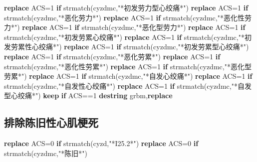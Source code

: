\documentclass[
]{book}
\newenvironment{Shaded}{\begin{snugshade}}{\end{snugshade}}
\newcommand{\FunctionTok}[1]{\textcolor[rgb]{0.00,0.00,0.00}{#1}}
\newcommand{\KeywordTok}[1]{\textcolor[rgb]{0.13,0.29,0.53}{\textbf{#1}}}
\newcommand{\NormalTok}[1]{#1}
\newcommand{\StringTok}[1]{\textcolor[rgb]{0.31,0.60,0.02}{#1}}
\begin{document}
\begin{Shaded}
\begin{Highlighting}[]
\KeywordTok{replace}\NormalTok{ ACS=1 }\KeywordTok{if} \FunctionTok{strmatch}\NormalTok{(cyzdmc,}\StringTok{"*初发劳力型心绞痛*"}\NormalTok{)}
\KeywordTok{replace}\NormalTok{ ACS=1 }\KeywordTok{if} \FunctionTok{strmatch}\NormalTok{(cyzdmc,}\StringTok{"*恶化劳力*"}\NormalTok{)}
\KeywordTok{replace}\NormalTok{ ACS=1 }\KeywordTok{if} \FunctionTok{strmatch}\NormalTok{(cyzdmc,}\StringTok{"*恶化性劳力*"}\NormalTok{)}
\KeywordTok{replace}\NormalTok{ ACS=1 }\KeywordTok{if} \FunctionTok{strmatch}\NormalTok{(cyzdmc,}\StringTok{"*恶化型劳力*"}\NormalTok{)}
\KeywordTok{replace}\NormalTok{ ACS=1 }\KeywordTok{if} \FunctionTok{strmatch}\NormalTok{(cyzdmc,}\StringTok{"*初发劳累心绞痛*"}\NormalTok{)}
\KeywordTok{replace}\NormalTok{ ACS=1 }\KeywordTok{if} \FunctionTok{strmatch}\NormalTok{(cyzdmc,}\StringTok{"*初发劳累性心绞痛*"}\NormalTok{)}
\KeywordTok{replace}\NormalTok{ ACS=1 }\KeywordTok{if} \FunctionTok{strmatch}\NormalTok{(cyzdmc,}\StringTok{"*初发劳累型心绞痛*"}\NormalTok{)}
\KeywordTok{replace}\NormalTok{ ACS=1 }\KeywordTok{if} \FunctionTok{strmatch}\NormalTok{(cyzdmc,}\StringTok{"*恶化劳累*"}\NormalTok{)}
\KeywordTok{replace}\NormalTok{ ACS=1 }\KeywordTok{if} \FunctionTok{strmatch}\NormalTok{(cyzdmc,}\StringTok{"*恶化性劳累*"}\NormalTok{)}
\KeywordTok{replace}\NormalTok{ ACS=1 }\KeywordTok{if} \FunctionTok{strmatch}\NormalTok{(cyzdmc,}\StringTok{"*恶化型劳累*"}\NormalTok{)}
\KeywordTok{replace}\NormalTok{ ACS=1 }\KeywordTok{if} \FunctionTok{strmatch}\NormalTok{(cyzdmc,}\StringTok{"*自发心绞痛*"}\NormalTok{)}
\KeywordTok{replace}\NormalTok{ ACS=1 }\KeywordTok{if} \FunctionTok{strmatch}\NormalTok{(cyzdmc,}\StringTok{"*自发性心绞痛*"}\NormalTok{)}
\KeywordTok{replace}\NormalTok{ ACS=1 }\KeywordTok{if} \FunctionTok{strmatch}\NormalTok{(cyzdmc,}\StringTok{"*自发型心绞痛*"}\NormalTok{)}
\KeywordTok{keep} \KeywordTok{if}\NormalTok{ ACS==1}
\KeywordTok{destring}\NormalTok{ grbm,}\KeywordTok{replace}
\end{Highlighting}
\end{Shaded}

\hypertarget{ux6392ux9664ux9648ux65e7ux6027ux5fc3ux808cux6897ux6b7b}{%
\subsection{排除陈旧性心肌梗死}\label{ux6392ux9664ux9648ux65e7ux6027ux5fc3ux808cux6897ux6b7b}}

\begin{Shaded}
\begin{Highlighting}[]
\KeywordTok{replace}\NormalTok{ ACS=0 }\KeywordTok{if} \FunctionTok{strmatch}\NormalTok{(cyzd,}\StringTok{"*I25.2*"}\NormalTok{)}
\KeywordTok{replace}\NormalTok{ ACS=0 }\KeywordTok{if} \FunctionTok{strmatch}\NormalTok{(cyzdmc,}\StringTok{"*陈旧*"}\NormalTok{)}
\end{Highlighting}
\end{Shaded}
\end{document}
